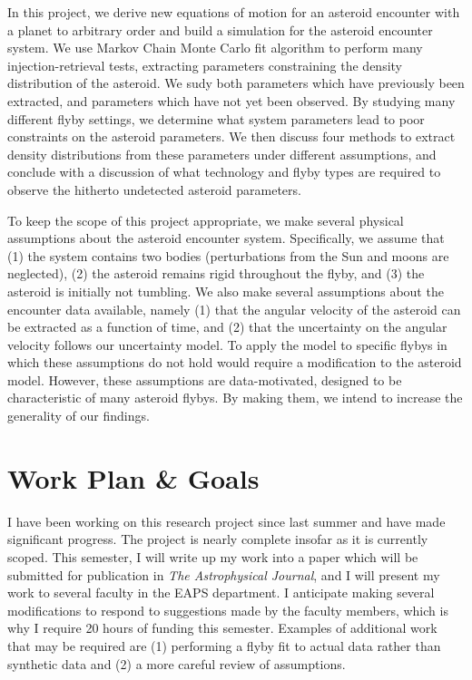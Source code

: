 \documentclass[11pt]{article}
\begin{document}
In this project, we derive new equations of motion for an asteroid encounter with a planet to arbitrary order and build a simulation for the asteroid encounter system. We use Markov Chain Monte Carlo fit algorithm to perform many injection-retrieval tests, extracting parameters constraining the density distribution of the asteroid. We sudy both parameters which have previously been extracted, and parameters which have not yet been observed. By studying many different flyby settings, we determine what system parameters lead to poor constraints on the asteroid parameters. We then discuss four methods to extract density distributions from these parameters under different assumptions, and conclude with a discussion of what technology and flyby types are required to observe the hitherto undetected asteroid parameters.

To keep the scope of this project appropriate, we make several physical assumptions about the asteroid encounter system. Specifically, we assume that (1) the system contains two bodies (perturbations from the Sun and moons are neglected), (2) the asteroid remains rigid throughout the flyby, and (3) the asteroid is initially not tumbling. We also make several assumptions about the encounter data available, namely (1) that the angular velocity of the asteroid can be extracted as a function of time, and (2) that the uncertainty on the angular velocity follows our uncertainty model. To apply the model to specific flybys in which these assumptions do not hold would require a modification to the asteroid model. However, these assumptions are data-motivated, designed to be characteristic of many asteroid flybys. By making them, we intend to increase the generality of our findings.


\section{Work Plan \& Goals}
I have been working on this research project since last summer and have made significant progress. The project is nearly complete insofar as it is currently scoped. This semester, I will write up my work into a paper which will be submitted for publication in \textit{The Astrophysical Journal}, and I will present my work to several faculty in the EAPS department. I anticipate making several modifications to respond to suggestions made by the faculty members, which is why I require 20 hours of funding this semester. Examples of additional work that may be required are (1) performing a flyby fit to actual data rather than synthetic data and (2) a more careful review of assumptions.
\end{document}
